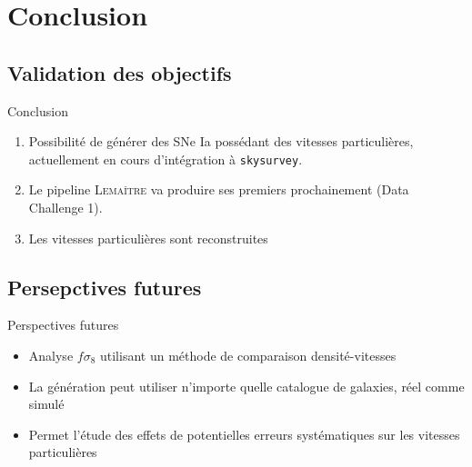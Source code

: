 \documentclass{beamer}
\newcommand{\lemaitre}{\textsc{Lemaître}\xspace}
\begin{document}
\section{Conclusion}

\subsection{Validation des objectifs}

\begin{frame}{Conclusion}
\begin{enumerate}
\item Possibilité de générer des SNe Ia possédant des vitesses particulières, actuellement en cours d'intégration à \texttt{skysurvey}.
\item Le pipeline \lemaitre va produire ses premiers prochainement (Data Challenge 1).
\item Les vitesses particulières sont reconstruites
\end{enumerate}
\end{frame}

\subsection{Persepctives futures}

\begin{frame}{Perspectives futures}
\begin{itemize}
\item Analyse $f\sigma_8$ utilisant un méthode de comparaison densité-vitesses
\item La génération peut utiliser n'importe quelle catalogue de galaxies, réel comme simulé
\item Permet l'étude des effets de potentielles erreurs systématiques sur les vitesses particulières
\end{itemize}
\end{frame}
\end{document}
